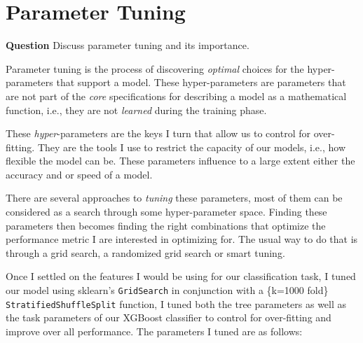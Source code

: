 \documentclass[titlepage,numbers=noenddot,headinclude,%
               footinclude=true,abstractoff,BCOR=5mm,%
               paper=a4,fontsize=11pt,ngerman,american]{scrreprt}
\numberwithin{theorem}{chapter}
\numberwithin{definition}{chapter}
\numberwithin{algorithm}{chapter}
\numberwithin{figure}{chapter}
\numberwithin{table}{chapter}
\numberwithin{equation}{chapter}
\begin{document}
\section*{Parameter Tuning}

\textbf{Question} Discuss parameter tuning and its importance.

Parameter tuning is the process of discovering \emph{optimal} choices for the hyper-parameters that support a model. These hyper-parameters are parameters that are not part of the \emph{core} specifications for describing a model as a mathematical function, i.e., they are not \emph{learned} during the training phase.

These \emph{hyper}-parameters are the keys I turn that allow us to control for over-fitting. They are the tools I use to restrict the capacity of our models, i.e., how flexible the model can be. These parameters influence to a large extent either the accuracy and or speed of a model.

There are several approaches to \emph{tuning} these parameters, most of them can be considered as a search through some hyper-parameter space. Finding these parameters then becomes finding the right combinations that optimize the performance metric I are interested in optimizing for. The usual way to do that is through a grid search, a randomized grid search or smart tuning.



Once I settled on the features I would be using for our classification task, I tuned our model using sklearn's \texttt{GridSearch} in conjunction with a \{k=1000 fold\} \texttt{StratifiedShuffleSplit} function, I tuned both the tree parameters as well as the task parameters of our XGBoost classifier to control for over-fitting and improve over all performance. The parameters I tuned are as follows:
\end{document}
